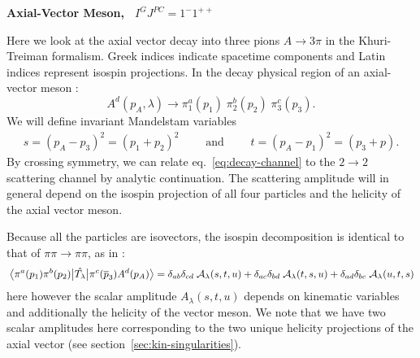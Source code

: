 \documentclass[10pt, aps,prd,amsmath,amssymb,superscriptaddress,onecolumn,
nofootinbib,showpacs,preprintnumbers]{revtex4-1}
\begin{document}
\begin{center}
\large \textbf{Axial-Vector Meson, \, \(I^G J^{PC} = 1^-1^{++}\)}
\end{center}

Here we look at the axial vector decay into three pions \(A \to 3\pi\) in the Khuri-Treiman formalism. Greek indices indicate spacetime components and Latin indices represent isospin projections.
In the decay physical region of an axial-vector meson :
  \begin{equation}
    \label{eq:decay-channel}
    A^d(p_A, \lambda) \rightarrow \pi_1^a(p_1)\;  \pi_2^b(p_2) \; \pi^c_3(p_3).
  \end{equation}
We will define invariant Mandelstam variables
  \begin{align}
    s = (p_A - p_3)^2 = (p_1 + p_2)^2 \qquad \text{ and } \qquad t = (p_A - p_1)^2 = (p_3 + p).
  \end{align}
By crossing symmetry, we can relate eq.~\ref{eq:decay-channel} to the \(2\to2\) scattering channel by analytic continuation. The scattering amplitude will in general depend on the isospin projection of all four particles and the helicity of the axial vector meson.

Because all the particles are isovectors, the isospin decomposition is identical to that of \(\pi\pi\to\pi\pi\), as in \cite{Albaladejo2018}:
  \begin{equation}
    \label{eq:scalar-decomp}
    \mel{\pi^a(p_1)\pi^b(p_2)}{\hat{T_\lambda}}{\pi^c(\overline{p}_3)A^d(p_A)} = \delta_{ab}\delta_{cd} \; \mathcal{A}_\lambda(s,t,u) + \delta_{ac}\delta_{bd} \; \mathcal{A}_\lambda(t,s,u) + \delta_{ad}\delta_{bc} \; \mathcal{A}_\lambda(u,t,s)
  \end{equation}
here however the scalar amplitude \(A_\lambda(s,t,u)\) depends on kinematic variables and additionally the helicity of the vector meson. We note that we have two scalar amplitudes here corresponding to the two unique helicity projections of the axial vector (see section~\ref{sec:kin-singularities}).
\end{document}
